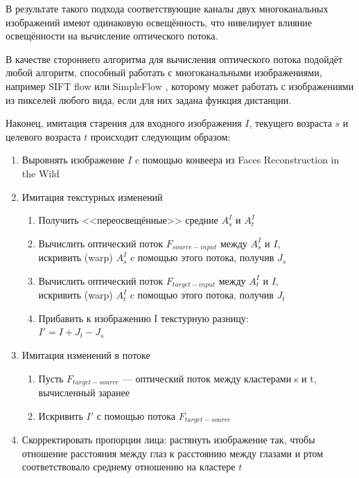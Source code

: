 В результате такого подхода соответствующие каналы двух многоканальных изображений имеют одинаковую освещённость, что нивелирует влияние освещённости на вычисление оптического потока.

В качестве стороннего алгоритма для вычисления оптического потока подойдёт любой алгоритм, способный работать с многоканальными изображениями, например SIFT flow \cite{sift_flow} или SimpleFlow \cite{simple_flow}, которому может работать с изображениями из пикселей любого вида, если для них задана функция дистанции.

Наконец, имитация старения для входного изображения $I$, текущего возраста $s$ и целевого возраста $t$ происходит следующим образом:
\begin{enumerate}
    \item Выровнять изображение $I$ c помощью конвеера из Faces Reconstruction in the Wild \cite{face_wild}
    \item Имитация текстурных изменений
    \begin{enumerate}
        \item Получить <<переосвещённые>> средние $ A^I_s $ и $ A^I_t $
        \item Вычислить оптический поток $ F_{source-input} $ между $ A^I_s $ и $I$, \\
         искривить (warp) $  A^I_s  $ c помощью этого потока, получив $ J_s $
        \item Вычислить оптический поток $ F_{target-input} $ между $ A^I_t $ и $I$, \\
         искривить (warp) $ A^I_t   $ c помощью этого потока, получив $ J_t $
        \item Прибавить к изображению I текстурную разницу: \\
        \mbox{$ I' = I + J_t - J_s $}
    \end{enumerate}

    \item Имитация изменений в потоке
    \begin{enumerate}
        \item Пусть $ F_{target-source} $ --- оптический поток между кластерами s и t, вычисленный заранее
        \item Искривить $I'$ с помощью потока $F_{target-source}$
    \end{enumerate}

    \item Скорректировать пропорции лица: растянуть изображение так, чтобы отношение расстояния между глаз к расстоянию между глазами и ртом соответствовало среднему отношению на кластере $t$
\end{enumerate}

